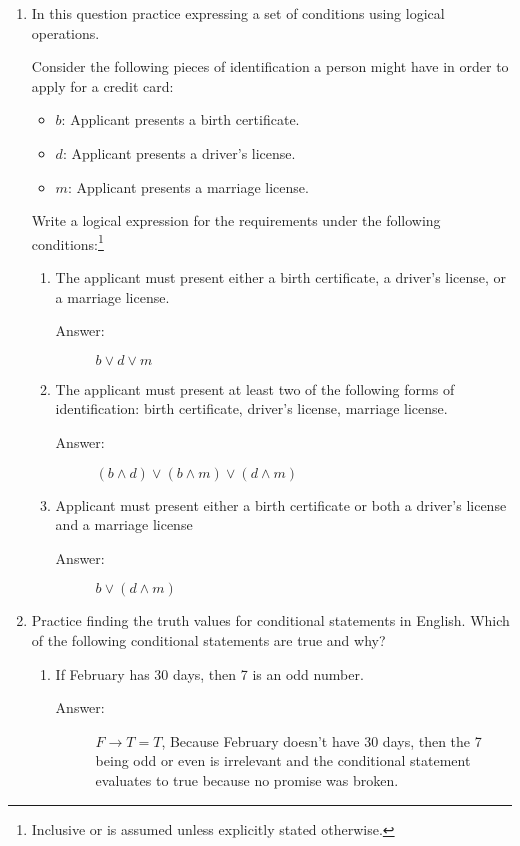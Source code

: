 \documentclass[12pt, oneside]{article}
\begin{document}
\begin{enumerate}
\item In this question practice expressing a set of conditions using logical operations.

Consider the following pieces of identification a person might have in order to apply for a credit card:
\begin{itemize}
    \item $b$: Applicant presents a birth certificate.
    \item $d$: Applicant presents a driver's license.
    \item $m$: Applicant presents a marriage license.
\end{itemize}

Write a logical expression for the requirements under the following conditions:\footnote{Inclusive or is assumed unless explicitly stated otherwise.}
\begin{enumerate}
    \item The applicant must present either a birth certificate, a driver's license, or a marriage license.
    \begin{description}
        \item[Answer:] $b \vee d \vee m$
    \end{description}

    \item The applicant must present at least two of the following forms of identification: birth certificate, driver's license, marriage license.
    \begin{description}
        \item[Answer:] $(b \wedge d) \vee (b \wedge m) \vee (d \wedge m)$
    \end{description}
    
    \item Applicant must present either a birth certificate or both a driver's license and a marriage license
    \begin{description}
        \item[Answer:] $b \vee (d \wedge m)$
    \end{description}
\end{enumerate}   

\item Practice finding the truth values for conditional statements in English. Which of the following conditional statements are true and why?
\begin{enumerate}
    \item If February has 30 days, then 7 is an odd number.
    \begin{description}
        \item[Answer:] $F \rightarrow T = T$, Because February doesn’t have 30 days, then the 7 being odd or even is irrelevant and the conditional statement evaluates to true because no promise was broken.
    \end{description}


\end{enumerate}
\end{enumerate}
\end{document}
